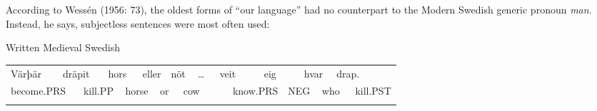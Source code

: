 \begin{styleBodytextC}
According to Wessén (1956: 73), the oldest forms of “our language” had no counterpart to the Modern Swedish generic pronoun \textit{man}. Instead, he says, subjectless sentences were most often used: 

\end{styleBodytextC}

\begin{listWWNumileveli}
\item {}

\begin{styleExample}
Written Medieval Swedish

\end{styleExample}

\end{listWWNumileveli}

\begin{listWWNumxcleveli}
\item {}

\end{listWWNumxcleveli}

\begin{tabular}{llllllllllllllllllll}
\lsptoprule
Värþär & \multicolumn{2}{l}{dräpit

} & \multicolumn{2}{l}{hors

} & \multicolumn{2}{l}{eller

} & \multicolumn{2}{l}{nöt

} & \multicolumn{2}{l}{…

} & \multicolumn{2}{l}{veit

} & \multicolumn{2}{l}{eig

} & \multicolumn{2}{l}{hvar

} & \multicolumn{2}{l}{drap.

} & \\
\multicolumn{2}{l}{become.PRS

} & \multicolumn{2}{l}{kill.PP

} & \multicolumn{2}{l}{horse

} & \multicolumn{2}{l}{or

} & \multicolumn{2}{l}{cow

} & \multicolumn{2}{l}{} & \multicolumn{2}{l}{know.PRS

} & \multicolumn{2}{l}{NEG

} & \multicolumn{2}{l}{who

} & \multicolumn{2}{l}{kill.PST

}\\
\lspbottomrule
\end{tabular}

